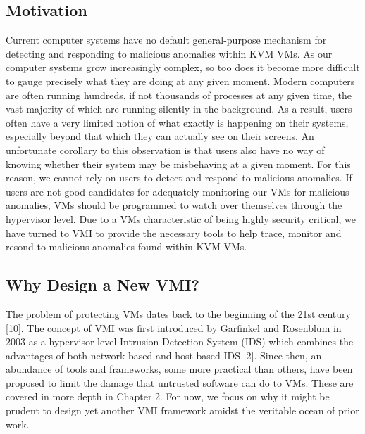 \documentclass{report}
\begin{document}
\begin{spacing}{1.5}
\section{Motivation}
{\large
Current computer systems have no default general-purpose mechanism for detecting and responding to malicious anomalies within KVM VMs. As our computer systems grow increasingly complex, so too does it become more difficult to gauge precisely what they are doing at any given moment. Modern computers are often running hundreds, if not thousands of processes at any given time, the vast majority of which are running silently in the background. As a result, users often have a very limited notion of what exactly is happening on their systems, especially beyond that which they can actually see on their screens. An unfortunate corollary to this observation is that users also have no way of knowing whether their system may be misbehaving at a given moment. For this reason, we cannot rely on users to detect and respond to malicious anomalies. If users are not good candidates for adequately monitoring our VMs for malicious anomalies, VMs should be programmed to watch over themselves through the hypervisor level. Due to a VMs
characteristic of being highly security critical, we have turned to VMI to provide the necessary tools to help trace, monitor and resond to malicious anomalies found within KVM VMs.
\newline
}















\subsection{Why Design a New VMI?}

{\large
The problem of protecting VMs dates back to the beginning of the 21st century [10]. The concept of VMI was first introduced by Garfinkel and Rosenblum in 2003 as a hypervisor-level Intrusion Detection System (IDS) which combines the advantages of both network-based and host-based IDS [2]. Since then, an abundance of tools and frameworks, some more practical than others, have been proposed to limit the damage that untrusted software can do to VMs. These are covered in more depth in Chapter 2. For now, we focus on why it might be prudent to design yet another VMI framework amidst the veritable ocean of prior work.
\newline
}


\end{spacing}
\end{document}
